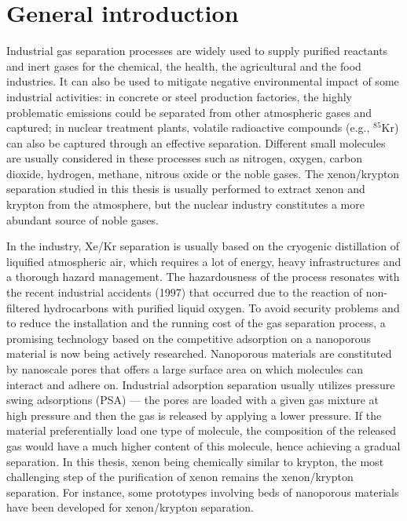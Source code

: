 
\chapter*{General introduction}

Industrial gas separation processes are widely used to supply purified reactants and inert gases for the chemical, the health, the agricultural and the food industries. It can also be used to mitigate negative environmental impact of some industrial activities: in concrete or steel production factories, the highly problematic  emissions could be separated from other atmospheric gases and captured; in nuclear treatment plants, volatile radioactive compounds (e.g., $^{85}$Kr) can also be captured through an effective separation. Different small molecules are usually considered in these processes such as nitrogen, oxygen, carbon
dioxide, hydrogen, methane, nitrous oxide or the noble gases. The xenon/krypton separation studied in this thesis is usually performed to extract xenon and krypton from the atmosphere,\autocite{kerry2007industrial} but the nuclear industry constitutes a more abundant source of noble gases.\autocite{Banerjee_2014} 

In the industry, Xe/Kr separation is usually based on the cryogenic distillation of liquified atmospheric air, which requires a lot of energy, heavy infrastructures and a thorough hazard management. The hazardousness of the process resonates with the recent industrial accidents (1997) that occurred due to the reaction of non-filtered hydrocarbons with purified liquid oxygen.\autocite{distill_accident,distill_accident2} To avoid security problems and to reduce the installation and the running cost of the gas separation process, a promising technology based on the competitive adsorption on a nanoporous material is now being actively researched. Nanoporous materials are constituted by nanoscale pores that offers a large surface area on which molecules can interact and adhere on. Industrial adsorption separation usually utilizes pressure swing adsorptions (PSA) --- the pores are loaded with a given gas mixture at high pressure and then the gas is released by applying a lower pressure. If the material preferentially load one type of molecule, the composition of the released gas would have a much higher content of this molecule, hence achieving a gradual separation. In this thesis, xenon being chemically similar to krypton, the most challenging step of the purification of xenon remains the xenon/krypton separation. For instance, some prototypes involving beds of nanoporous materials have been developed for xenon/krypton separation.\autocite{Banerjee2018} 

